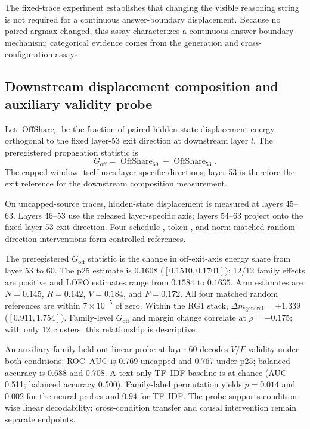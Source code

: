\documentclass[letterpaper]{article}
\begin{document}
The fixed-trace experiment establishes that changing the visible reasoning string is not required for a continuous answer-boundary displacement.  Because no paired argmax changed, this assay characterizes a continuous answer-boundary mechanism; categorical evidence comes from the generation and cross-configuration assays.

\subsection{Downstream displacement composition and auxiliary validity probe}

Let $\operatorname{OffShare}_l$ be the fraction of paired hidden-state displacement energy orthogonal to the fixed layer-53 exit direction at downstream layer $l$.  The preregistered propagation statistic is
\begin{equation}
G_{\mathrm{off}}=\operatorname{OffShare}_{60}-\operatorname{OffShare}_{53}.
\end{equation}
The capped window itself uses layer-specific directions; layer 53 is therefore the exit reference for the downstream composition measurement.

On uncapped-source traces, hidden-state displacement is measured at layers 45--63.  Layers 46--53 use the released layer-specific axis; layers 54--63 project onto the fixed layer-53 exit direction.  Four schedule-, token-, and norm-matched random-direction interventions form controlled references.

The preregistered $G_{\mathrm{off}}$ statistic is the change in off-exit-axis energy share from layer 53 to 60.  The p25 estimate is $0.1608$ ($[0.1510,0.1701]$); 12/12 family effects are positive and LOFO estimates range from $0.1584$ to $0.1635$.  Arm estimates are $N=0.145$, $R=0.142$, $V=0.184$, and $F=0.172$.  All four matched random references are within $7\times10^{-5}$ of zero.  Within the RG1 stack, $\Delta m_{\mathrm{general}}=+1.339$ ($[0.911,1.754]$).  Family-level $G_{\mathrm{off}}$ and margin change correlate at $\rho=-0.175$; with only 12 clusters, this relationship is descriptive.

An auxiliary family-held-out linear probe at layer 60 decodes $V/F$ validity under both conditions: ROC--AUC is 0.769 uncapped and 0.767 under p25; balanced accuracy is 0.688 and 0.708.  A text-only TF--IDF baseline is at chance (AUC 0.511; balanced accuracy 0.500).  Family-label permutation yields $p=0.014$ and $0.002$ for the neural probes and $0.94$ for TF--IDF.  The probe supports condition-wise linear decodability; cross-condition transfer and causal intervention remain separate endpoints.
\end{document}
